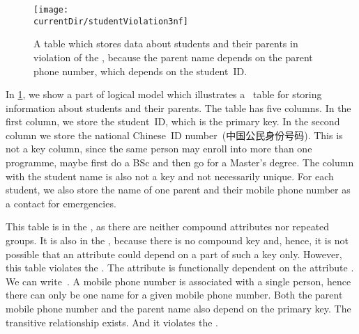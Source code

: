 %
\FloatBarrier%
%
\begin{figure}%
\centering%
%
\texttt{[image: \\currentDir/studentViolation3nf]}%
%
\caption{A table which stores data about students and their parents in violation of the , because the parent name depends on the parent phone number, which depends on the student~ID.}%
\label{fig:studentViolation3nf}%
\end{figure}%
%
%
%
%
%
%
%
%
%
%
%
%
In \cref{fig:studentViolation3nf}, we show a part of logical model which illustrates a \db\ table for storing information about students and their parents.
The table has five columns.
In the first column, we store the student~ID, which is the primary key.
In the second column we store the national Chinese~ID number~(中国公民身份号码).
This is not a key column, since the same person may enroll into more than one programme, maybe first do a BSc and then go for a Master's degree.
The column with the student name is also not a key and not necessarily unique.
For each student, we also store the name of one parent and their mobile phone number as a contact for emergencies.

This table is in the , as there are neither compound attributes nor repeated groups.
It is also in the , because there is no compound key and, hence, it is not possible that an attribute could depend on a part of such a key only.
However, this table violates the .
The attribute  is functionally dependent on the attribute .
We can write~.
A mobile phone number is associated with a single person, hence there can only be one name for a given mobile phone number.
Both the parent mobile phone number and the parent name also depend on the primary key.
The transitive relationship  exists.
And it violates the .

